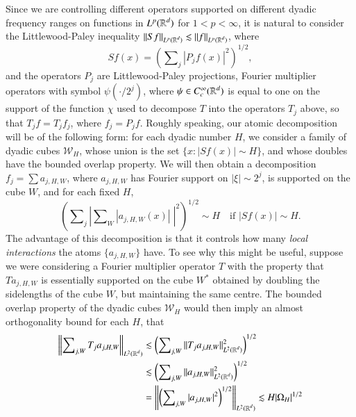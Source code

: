 Since we are controlling different operators supported on different dyadic frequency ranges on functions in $L^p(\operatorname{\mathbb{R}}^d)$ for $1 < p < \infty$, it is natural to consider the Littlewood-Paley inequality $\| Sf \|_{L^p(\operatorname{\mathbb{R}}^d)} \lesssim \| f \|_{L^p(\operatorname{\mathbb{R}}^d)}$, where
%
\begin{equation}
  Sf(x) = \left( \sum\nolimits_j |P_j f(x)|^2 \right)^{1/2},
\end{equation}
%
and the operators $P_j$ are Littlewood-Paley projections, Fourier multiplier operators with symbol $\psi(\cdot / 2^j)$, where $\psi \in C_c^\infty(\operatorname{\mathbb{R}}^d)$ is equal to one on the support of the function $\chi$ used to decompose $T$ into the operators $T_j$ above, so that $T_j f = T_j f_j$, where $f_j = P_j f$. Roughly speaking, our atomic decomposition will be of the following form: for each dyadic number $H$, we consider a family of dyadic cubes $\mathcal{W}_H$, whose union is the set $\{ x : |Sf(x)| \sim H \}$, and whose doubles have the bounded overlap property. We will then obtain a decomposition $f_j = \sum a_{j,H,W}$, where $a_{j,H,W}$ has Fourier support on $|\xi| \sim 2^j$, is supported on the cube $W$, and for each fixed $H$,
%
\begin{equation}
  \left( \sum\nolimits_j \left|\sum\nolimits_W |a_{j,H,W}(x)|\; \right|^2 \right)^{1/2} \sim H \quad\text{if $|Sf(x)| \sim H$}.
\end{equation}
%
The advantage of this decomposition is that it controls how many \emph{local interactions} the atoms $\{ a_{j,H,W} \}$ have. To see why this might be useful, suppose we were considering a Fourier multiplier operator $T$ with the property that $T a_{j,H,W}$ is essentially supported on the cube $W^*$ obtained by doubling the sidelengths of the cube $W$, but maintaining the same centre. The bounded overlap property of the dyadic cubes $\mathcal{W}_H$ would then imply an almost orthogonality bound for each $H$, that
%
\begin{equation}
\begin{split}
  \left\| \sum\nolimits_{j,W} T_j a_{j,H,W} \right\|_{L^2(\operatorname{\mathbb{R}}^d)} &\lesssim \left( \sum\nolimits_{j,W} \| T_j a_{j,H,W} \|_{L^2(\operatorname{\mathbb{R}}^d)}^2 \right)^{1/2}\\
  &\lesssim \left( \sum\nolimits_{j,W} \| a_{j,H,W} \|_{L^2(\operatorname{\mathbb{R}}^d)}^2 \right)^{1/2}\\
  &= \left\| \left( \sum\nolimits_{j,W} |a_{j,H,W}|^2 \right)^{1/2} \right\|_{L^2(\operatorname{\mathbb{R}}^d)} \lesssim H |\Omega_H|^{1/2}
\end{split}
\end{equation}
